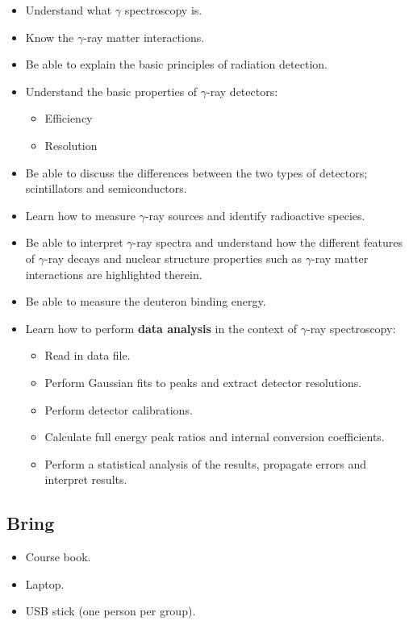 \documentclass[12pt]{article}
\begin{document}
\begin{itemize}
  \item Understand what $\gamma$ spectroscopy is.
  \item Know the $\gamma$-ray matter interactions.
  \item Be able to explain the basic principles of radiation detection.
  \item Understand the basic properties of $\gamma$-ray detectors:
  \begin{itemize}
    \item Efficiency
    \item Resolution
  \end{itemize}
  \item Be able to discuss the differences between the two types of detectors; scintillators and semiconductors.
  \item Learn how to measure $\gamma$-ray sources and identify radioactive species.
  \item Be able to interpret $\gamma$-ray spectra and understand how the different features of $\gamma$-ray decays and nuclear structure properties such as $\gamma$-ray matter interactions are highlighted therein.
  \item Be able to measure the deuteron binding energy.
  \item Learn how to perform \textbf{data analysis} in the context of $\gamma$-ray spectroscopy:
  \begin{itemize}
    \item Read in data file.
    \item Perform Gaussian fits to peaks and extract detector resolutions.
    \item Perform detector calibrations.
    \item Calculate full energy peak ratios and internal conversion coefficients.
    \item Perform a statistical analysis of the results, propagate errors and interpret results.
  \end{itemize}
\end{itemize}


\subsection*{Bring}
\begin{itemize}
  \item Course book.
  \item Laptop.
  \item USB stick (one person per group).
\end{itemize}
\end{document}
